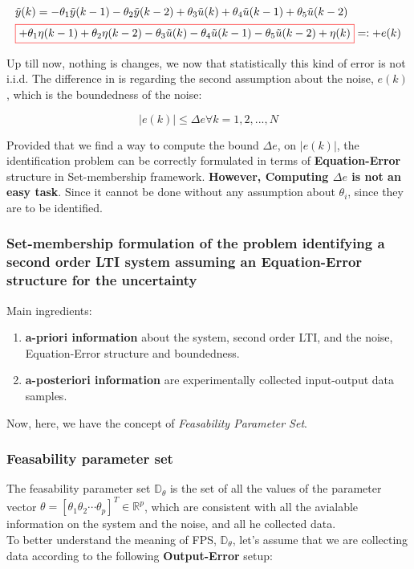 \[
\begin{array}{l}
\tilde{y}(k)= -\theta_1 \tilde{y}(k - 1) - \theta_2 \tilde{y}(k - 2) + \theta_3 \tilde{u}(k) + \theta_4 \tilde{u}(k - 1) + \theta_5 \tilde{u}(k - 2) \\[1ex]
\textcolor{red}{\fbox{\textcolor{black}{$+ \theta_1\eta(k-1) + \theta_2\eta(k-2) - \theta_3\tilde{u}(k) - \theta_4\tilde{u}(k-1) - \theta_5\tilde{u}(k-2) + \eta(k) $}}} =: + e(k) \\
\end{array}
\]

Up till now, nothing is changes, we now that statistically this kind of error is not i.i.d. The difference in is regarding the second assumption about the noise, \(e(k)\), which is the boundedness of the noise:

\[\left| e(k)\right| \leq \Delta e \forall k = 1, 2, ..., N\]

Provided that we find a way to compute the bound \(\Delta e \), on \(\left| e(k)\right|\), the identification problem can be correctly formulated in terms of \textbf{Equation-Error} structure in Set-membership framework. \textbf{However, Computing \(\Delta e \) is not an easy task}. Since it cannot be done without any assumption about \(\theta_i\), since they are to be identified.

\subsubsection{Set-membership formulation of the problem identifying a second order LTI system assuming an Equation-Error structure for the uncertainty}
Main ingredients:
\begin{enumerate}
\item \textbf{a-priori information }about the system, second order LTI, and the noise, Equation-Error structure and boundedness.
\item\textbf{ a-posteriori information} are experimentally collected input-output data samples.
\end{enumerate}
Now, here, we have the concept of \textit{Feasability Parameter Set}.

\subsubsection{Feasability parameter set}
The feasability parameter set \(\mathbb{D}_\theta\) is the set of all the values of the parameter vector \(\theta = \left[ \theta_1 \theta_2 \cdots \theta_p \right]^T \in \mathbb{R}^p\), which are consistent with all the avialable information on the system and the noise, and all he collected data.\\
To better understand the meaning of FPS, \(\mathbb{D}_\theta\), let's assume that we are collecting data according to the following\textbf{ Output-Error} setup:\\

